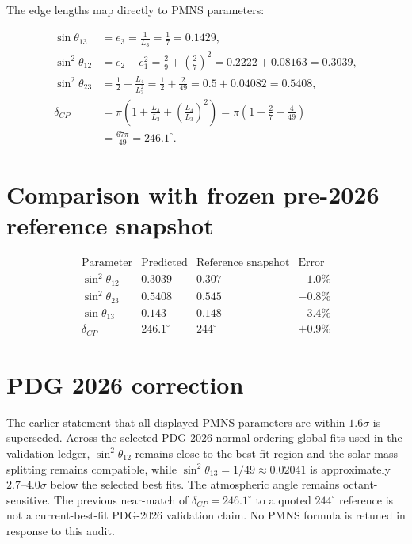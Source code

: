 The edge lengths map directly to PMNS parameters:

\[
\begin{aligned}
\sin\theta_{13} &= e_3 = \frac{1}{L_3} = \frac{1}{7} = 0.1429, \\[4pt]
\sin^2\theta_{12} &= e_2 + e_1^2
    = \frac{2}{9} + \left(\frac{2}{7}\right)^2
    = 0.2222 + 0.08163
    = 0.3039, \\[4pt]
\sin^2\theta_{23} &= \frac12 + \frac{L_4}{L_3^2}
    = \frac12 + \frac{2}{49}
    = 0.5 + 0.04082
    = 0.5408, \\[4pt]
\delta_{CP} &= \pi\left(1 + \frac{L_4}{L_3} + \left(\frac{L_4}{L_3}\right)^2\right)
    = \pi\left(1 + \frac{2}{7} + \frac{4}{49}\right) \\[4pt]
    &= \frac{67\pi}{49}
    = 246.1^\circ.
\end{aligned}
\]

\section{Comparison with frozen pre-2026 reference snapshot}

\[
\begin{array}{lccc}
\text{Parameter} & \text{Predicted} & \text{Reference snapshot} & \text{Error} \\
\hline
\sin^2\theta_{12} & 0.3039 & 0.307 & -1.0\% \\
\sin^2\theta_{23} & 0.5408 & 0.545 & -0.8\% \\
\sin\theta_{13} & 0.143 & 0.148 & -3.4\% \\
\delta_{CP} & 246.1^\circ & 244^\circ & +0.9\%
\end{array}
\]

\section{PDG 2026 correction}
The earlier statement that all displayed PMNS parameters are within
$1.6\sigma$ is superseded.  Across the selected PDG-2026 normal-ordering
global fits used in the validation ledger, $\sin^2\theta_{12}$ remains close
to the best-fit region and the solar mass splitting remains compatible, while
$\sin^2\theta_{13}=1/49\approx0.02041$ is approximately $2.7$--$4.0\sigma$
below the selected best fits.  The atmospheric angle remains octant-sensitive.
The previous near-match of $\delta_{CP}=246.1^\circ$ to a quoted
$244^\circ$ reference is not a current-best-fit PDG-2026 validation claim.
No PMNS formula is retuned in response to this audit.
